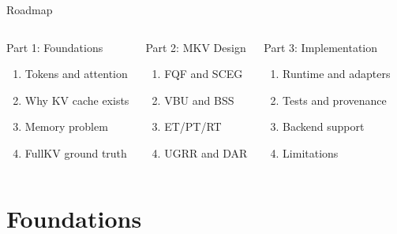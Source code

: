 \documentclass[aspectratio=169,10pt]{beamer}
\newcommand{\tightitems}{\setlength{\itemsep}{0.28em}\setlength{\parskip}{0pt}}
\begin{document}
\begin{frame}{Roadmap}
\small
\begin{columns}[T,onlytextwidth]
\begin{block}{Part 1: Foundations}
\begin{enumerate}\tightitems
  \item Tokens and attention
  \item Why KV cache exists
  \item Memory problem
  \item FullKV ground truth
\end{enumerate}
\end{block}
\begin{block}{Part 2: MKV Design}
\begin{enumerate}\tightitems
  \setcounter{enumi}{4}
  \item FQF and SCEG
  \item VBU and BSS
  \item ET/PT/RT
  \item UGRR and DAR
\end{enumerate}
\end{block}
\begin{block}{Part 3: Implementation}
\begin{enumerate}\tightitems
  \setcounter{enumi}{8}
  \item Runtime and adapters
  \item Tests and provenance
  \item Backend support
  \item Limitations
\end{enumerate}
\end{block}
\end{columns}
\end{frame}

\section{Foundations}
\end{document}
